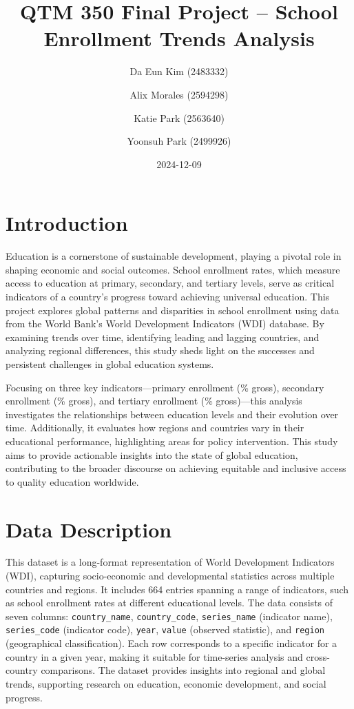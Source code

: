 \documentclass[
  letterpaper,
  DIV=11,
  numbers=noendperiod]{scrartcl}
\title{QTM 350 Final Project -- School Enrollment Trends Analysis}
\author{Da Eun Kim (2483332) \and Alix Morales (2594298) \and Katie Park
(2563640) \and Yoonsuh Park (2499926)}
\date{2024-12-09}
\renewcommand*\contentsname{Table of contents}
\newcommand\contentsname{Table of contents}
\begin{document}
\maketitle

\renewcommand*\contentsname{Table of contents}
{
\hypersetup{linkcolor=}
\setcounter{tocdepth}{2}
\tableofcontents
}

\section{Introduction}\label{introduction}

Education is a cornerstone of sustainable development, playing a pivotal
role in shaping economic and social outcomes. School enrollment rates,
which measure access to education at primary, secondary, and tertiary
levels, serve as critical indicators of a country's progress toward
achieving universal education. This project explores global patterns and
disparities in school enrollment using data from the World Bank's World
Development Indicators (WDI) database. By examining trends over time,
identifying leading and lagging countries, and analyzing regional
differences, this study sheds light on the successes and persistent
challenges in global education systems.

Focusing on three key indicators---primary enrollment (\% gross),
secondary enrollment (\% gross), and tertiary enrollment (\%
gross)---this analysis investigates the relationships between education
levels and their evolution over time. Additionally, it evaluates how
regions and countries vary in their educational performance,
highlighting areas for policy intervention. This study aims to provide
actionable insights into the state of global education, contributing to
the broader discourse on achieving equitable and inclusive access to
quality education worldwide.

\section{Data Description}\label{data-description}

This dataset is a long-format representation of World Development
Indicators (WDI), capturing socio-economic and developmental statistics
across multiple countries and regions. It includes 664 entries spanning
a range of indicators, such as school enrollment rates at different
educational levels. The data consists of seven columns:
\texttt{country\_name}, \texttt{country\_code}, \texttt{series\_name}
(indicator name), \texttt{series\_code} (indicator code), \texttt{year},
\texttt{value} (observed statistic), and \texttt{region} (geographical
classification). Each row corresponds to a specific indicator for a
country in a given year, making it suitable for time-series analysis and
cross-country comparisons. The dataset provides insights into regional
and global trends, supporting research on education, economic
development, and social progress.
\end{document}
